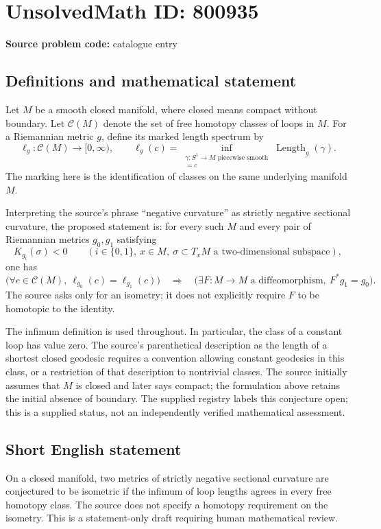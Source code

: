 \documentclass[11pt]{article}
\begin{document}
\section*{UnsolvedMath ID: 800935}
\textbf{Source problem code:} catalogue entry
\subsection{Definitions and mathematical statement}
Let \(M\) be a smooth closed manifold, where closed means compact without boundary. Let \(\mathcal{C}(M)\) denote the set of free homotopy classes of loops in \(M\). For a Riemannian metric \(g\), define its marked length spectrum by
\[
\ell_g\colon\mathcal{C}(M)\longrightarrow[0,\infty),\qquad
\ell_g(c)=\inf_{\substack{\gamma\colon S^1\to M\text{ piecewise smooth}\\[\gamma]=c}}\operatorname{Length}_g(\gamma).
\]
The marking here is the identification of classes on the same underlying manifold \(M\).

Interpreting the source's phrase ``negative curvature'' as strictly negative sectional curvature, the proposed statement is: for every such \(M\) and every pair of Riemannian metrics \(g_0,g_1\) satisfying
\[
K_{g_i}(\sigma)<0\qquad
(i\in\{0,1\},\ x\in M,\ \sigma\subset T_xM\text{ a two-dimensional subspace}),
\]
one has
\[
\bigl(\forall c\in\mathcal{C}(M),\ \ell_{g_0}(c)=\ell_{g_1}(c)\bigr)
\quad\Longrightarrow\quad
\bigl(\exists F\colon M\to M\text{ a diffeomorphism},\ F^*g_1=g_0\bigr).
\]
The source asks only for an isometry; it does not explicitly require \(F\) to be homotopic to the identity.

The infimum definition is used throughout. In particular, the class of a constant loop has value zero. The source's parenthetical description as the length of a shortest closed geodesic requires a convention allowing constant geodesics in this class, or a restriction of that description to nontrivial classes. The source initially assumes that \(M\) is closed and later says compact; the formulation above retains the initial absence of boundary. The supplied registry labels this conjecture open; this is a supplied status, not an independently verified mathematical assessment.
\subsection{Short English statement}
On a closed manifold, two metrics of strictly negative sectional curvature are conjectured to be isometric if the infimum of loop lengths agrees in every free homotopy class. The source does not specify a homotopy requirement on the isometry. This is a statement-only draft requiring human mathematical review.
\end{document}
